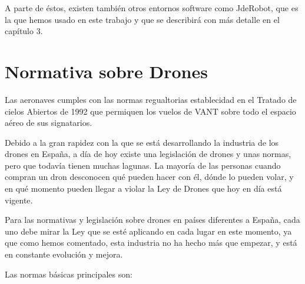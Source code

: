 A parte de éstos, existen también otros entornos software como JdeRobot, que es la que hemos usado en este trabajo y que se describirá con más detalle en el capítulo 3.

\section{Normativa sobre Drones}
\label{sec:normativa}

Las aeronaves cumples con las normas regualtorias establecidad en el Tratado de cielos Abiertos de 1992 que permiquen los vuelos de VANT sobre todo el espacio aéreo de sus signatarios.

Debido a la gran rapidez con la que se está desarrollando la industria de los drones en España, a día de hoy existe una legislación\cite{normativa} de drones y unas normas, pero que todavía tienen muchas lagunas. La mayoría de las personas cuando compran un dron desconocen qué pueden hacer con él, dónde lo pueden volar, y en qué momento pueden llegar a violar la Ley de Drones que hoy en día está vigente.

Para las normativas y legislación sobre drones en países diferentes a España, cada uno debe mirar la Ley que se esté aplicando en cada lugar en este momento, ya que como hemos comentado, esta industria no ha hecho más que empezar, y está en constante evolución y mejora.

Las normas básicas principales son:

